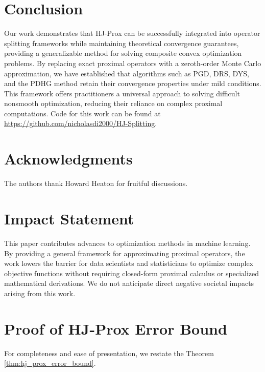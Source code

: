 \documentclass{article}
\theoremstyle{plain}
\theoremstyle{definition}
\theoremstyle{remark}
\begin{document}
\section{Conclusion}
Our work demonstrates that HJ-Prox can be successfully integrated into operator splitting frameworks while maintaining theoretical convergence guarantees, providing a generalizable method for solving composite convex optimization problems. By replacing exact proximal operators with a zeroth-order Monte Carlo approximation, we have established that algorithms such as PGD, DRS, DYS, and the PDHG method retain their convergence properties under mild conditions. This framework offers practitioners a universal approach to solving difficult nonsmooth optimization, reducing their reliance on complex proximal computations. Code for this work can be found at \url{https://github.com/nicholasdi2000/HJ-Splitting}.

\newpage
\section*{Acknowledgments}
The authors thank Howard Heaton for fruitful discussions.
\section*{Impact Statement}
This paper contributes advances to optimization methods in machine learning. By providing a general framework for approximating proximal operators, the work lowers the barrier for data scientists and statisticians to optimize complex objective functions without requiring closed-form proximal calculus or specialized mathematical derivations. We do not anticipate direct negative societal impacts arising from this work.




\appendix
\onecolumn

\section{Proof of HJ-Prox Error Bound}
For completeness and ease of presentation, we restate the Theorem \ref{thm:hj_prox_error_bound}.
\end{document}
